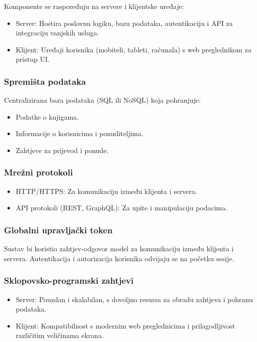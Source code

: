         Komponente se raspoređuju na servere i klijentske uređaje:
        \begin{itemize}
		  \item {Server: Hostira poslovnu logiku, bazu podataka, autentikaciju i API za integraciju vanjskih usluga.}
		  \item {Klijent: Uređaji korisnika (mobiteli, tableti, računala) s web preglednikom za pristup UI.}
	   \end{itemize}
    
    \subsubsection{Spremišta podataka}

        Centralizirana baza podataka (SQL ili NoSQL) koja pohranjuje:
        \begin{itemize}
		  \item {Podatke o knjigama.}
		  \item {Informacije o korisnicima i ponuditeljima.}
		  \item {Zahtjeve za prijevod i ponude.}				
	   \end{itemize}

    \subsubsection{Mrežni protokoli}
    
    \begin{itemize}
		  \item {HTTP/HTTPS: Za komunikaciju između klijenta i servera.}
		  \item {API protokoli (REST, GraphQL): Za upite i manipulaciju podacima.}
	   \end{itemize}

    \subsubsection{Globalni upravljački token}

        Sustav bi koristio zahtjev-odgovor model za komunikaciju između klijenta i servera. Autentikacija i autorizacija korisnika odvijaju se na početku sesije.
    
    \subsubsection{Sklopovsko-programski zahtjevi}

    \begin{itemize}
		  \item {Server: Pouzdan i skalabilan, s dovoljno resursa za obradu zahtjeva i pohranu podataka.}
		  \item {Klijent: Kompatibilnost s modernim web preglednicima i prilagodljivost različitim veličinama ekrana.}			
	   \end{itemize}
	   
